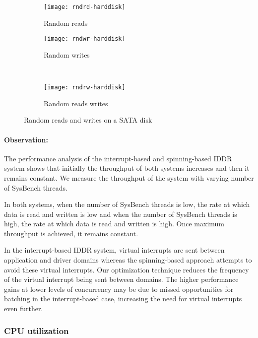 \begin{figure}[!ht]
  \begin{subfigure}[b]{0.2\textwidth}
  \texttt{[image: rndrd-harddisk]}
  \caption{Random reads}
  \label{subfig:rndrd-harddisk}
  \end{subfigure}
  \hspace{50mm}
  \begin{subfigure}[b]{0.2\textwidth}
  \texttt{[image: rndwr-harddisk]}
  \caption{Random writes}
  \label{subfig:rndwr-harddisk}
  \end{subfigure}\\
  \begin{subfigure}[b]{0.3\textwidth}
  \texttt{[image: rndrw-harddisk]}
  \caption{Random reads writes}
  \label{subfig:rndrw-harddisk}
  \end{subfigure}
\caption{Random reads and writes on a SATA disk}\label{fig:rndharddisk}
\end{figure}

\paragraph{Observation:}
The performance analysis of the interrupt-based and spinning-based IDDR system
shows that initially the throughput of both systems increases and then it
remains constant. We measure the throughput of the system with varying
number of SysBench threads.

In both systems, when the number of SysBench threads is low,
the rate at which data is read and written is low and when the number of
SysBench threads is high, the rate at which data is read and written is
high.  Once maximum throughput is achieved, it remains constant.

In the interrupt-based IDDR system, virtual interrupts are sent between
application and driver domains whereas the spinning-based approach
attempts to avoid these virtual interrupts.  
Our optimization technique reduces the frequency of the
virtual interrupt being sent between domains. 
The higher performance gains at lower levels of concurrency
may be due to missed opportunities for batching in the interrupt-based case,
increasing the need for virtual interrupts even further.

\subsubsection*{CPU utilization}

